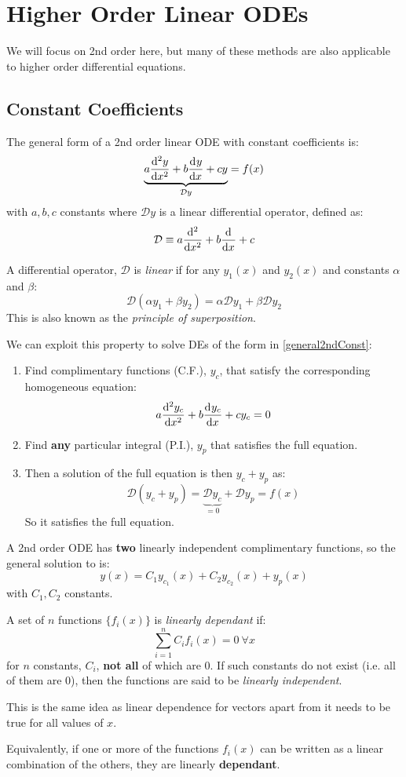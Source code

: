 \documentclass[../main.tex]{subfiles}
\begin{document}
\chapter{Higher Order Linear ODEs}
We will focus on 2nd order here, but many of these methods are also applicable to higher order differential equations.
\section{Constant Coefficients}
The general form of a 2nd order linear ODE with constant coefficients is:
\begin{equation}
  \label{general2ndConst}
  \underbrace{a \deriv[2]{y}{x} + b \deriv{y}{x} + cy}_{\mathcal{D}y} = f(x)
\end{equation}
with $a, b, c$ constants where $\mathcal{D}y$ is a linear differential operator, defined as:
\[
  \mathcal{D} \equiv a \deriv[2]{}{x} + b \deriv{}{x} + c
\]
\begin{definition}
  A differential operator, $\mathcal{D}$ is \textit{linear} if for any $y_1(x)$ and $y_2(x)$ and constants $\alpha$ and $\beta$:
  \[
    \mathcal{D}(\alpha y_1 + \beta y_2) = \alpha \mathcal{D}y_1 + \beta \mathcal{D}y_2
  \]
  This is also known as the \textit{principle of superposition}.
\end{definition}
We can exploit this property to solve DEs of the form in \cref{general2ndConst}:
\label{constantCoeffMethod}
\begin{enumerate}
  \item Find complimentary functions (C.F.), $y_c$, that satisfy the corresponding homogeneous equation:
    \[
      a \deriv[2]{y_c}{x} + b \deriv{y_c}{x} + c y_c = 0
    \]
  \item Find \textbf{any} particular integral (P.I.), $y_p$ that satisfies the full equation.
  \item Then a solution of the full equation is then $y_c + y_p$ as:
    \[
      \mathcal{D}(y_c + y_p) = \underbrace{\mathcal{D}y_c}_{=0} + \mathcal{D}y_p = f(x)
    \]
    So it satisfies the full equation.
\end{enumerate}
A 2nd order ODE has \textbf{two} linearly independent complimentary functions, so the general solution to is:
\[
  y(x) = C_1 y_{c_1}(x) + C_2 y_{c_2}(x) + y_p(x)
\]
with $C_1, C_2$ constants.
\begin{definition}
  A set of $n$ functions $\{f_i(x)\}$ is \textit{linearly dependant} if: \label{linearDependence}
  \[
    \sum_{i=1}^{n} C_i f_i(x) = 0\ \forall x
  \]
  for $n$ constants, $C_i$, \textbf{not all} of which are $0$.
  If such constants do not exist (i.e. all of them are 0), then the functions are said to be \textit{linearly independent}.
\end{definition}
\begin{remark}
  This is the same idea as linear dependence for vectors apart from it needs to be true for all values of $x$.
\end{remark}
Equivalently, if one or more of the functions $f_i(x)$  can be written as a linear combination of the others, they are linearly \textbf{dependant}.
\end{document}
